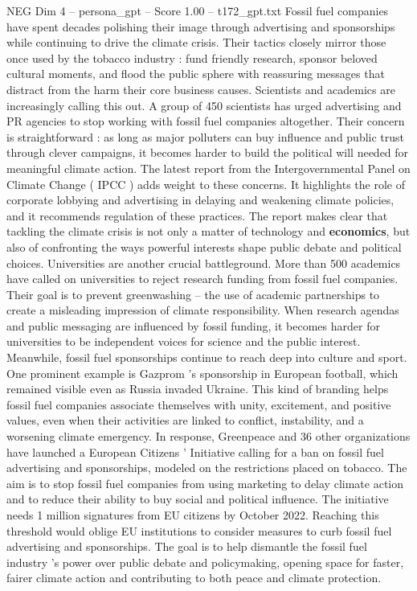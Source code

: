\begin{textsample}{NEG Dim 4 – persona\_gpt – Score 1.00 – t172\_gpt.txt}  \label{ex:f4_neg_039}
Fossil fuel companies have spent decades polishing their image through advertising and sponsorships while continuing to drive the climate crisis.
Their tactics closely mirror those once used by the tobacco industry : fund friendly research, sponsor beloved cultural moments, and flood the public sphere with reassuring messages that distract from the harm their core business causes.
Scientists and academics are increasingly calling this out.
A group of 450 scientists has urged advertising and PR agencies to stop working with fossil fuel companies altogether.
Their concern is straightforward : as long as major polluters can buy influence and public trust through clever campaigns, it becomes harder to build the political will needed for meaningful climate action.
The latest report from the Intergovernmental Panel on Climate Change ( IPCC ) adds weight to these concerns.
It highlights the role of corporate lobbying and advertising in delaying and weakening climate policies, and it recommends regulation of these practices.
The report makes clear that tackling the climate crisis is not only a matter of technology and \textbf{economics}, but also of confronting the ways powerful interests shape public debate and political choices.
Universities are another crucial battleground.
More than 500 academics have called on universities to reject research funding from fossil fuel companies.
Their goal is to prevent greenwashing – the use of academic partnerships to create a misleading impression of climate responsibility.
When research agendas and public messaging are influenced by fossil funding, it becomes harder for universities to be independent voices for science and the public interest.
Meanwhile, fossil fuel sponsorships continue to reach deep into culture and sport.
One prominent example is Gazprom ’s sponsorship in European football, which remained visible even as Russia invaded Ukraine.
This kind of branding helps fossil fuel companies associate themselves with unity, excitement, and positive values, even when their activities are linked to conflict, instability, and a worsening climate emergency.
In response, Greenpeace and 36 other organizations have launched a European Citizens ’ Initiative calling for a ban on fossil fuel advertising and sponsorships, modeled on the restrictions placed on tobacco.
The aim is to stop fossil fuel companies from using marketing to delay climate action and to reduce their ability to buy social and political influence.
The initiative needs 1 million signatures from EU citizens by October 2022.
Reaching this threshold would oblige EU institutions to consider measures to curb fossil fuel advertising and sponsorships.
The goal is to help dismantle the fossil fuel industry ’s power over public debate and policymaking, opening space for faster, fairer climate action and contributing to both peace and climate protection.

\end{textsample}
